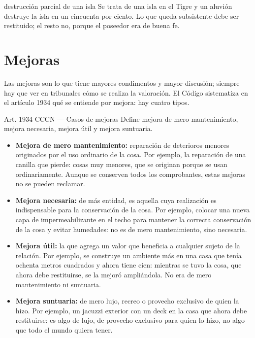 \documentclass[12pt,oneside]{book}
\begin{document}
\begin{example}{destrucción parcial de una isla}
Se trata de una isla en el Tigre y un aluvión destruye la isla en un cincuenta por ciento. Lo que queda subsistente debe ser restituido; el resto no, porque el poseedor era de buena fe.
\end{example}

\section{Mejoras}

Las mejoras son lo que tiene mayores condimentos y mayor discusión; siempre hay que ver en tribunales cómo se realiza la valoración. El Código sistematiza en el artículo 1934 qué se entiende por mejora: hay cuatro tipos.

\begin{articulo}{Art. 1934 CCCN --- Casos de mejoras}
Define mejora de mero mantenimiento, mejora necesaria, mejora útil y mejora suntuaria.
\end{articulo}

\begin{itemize}
    \item \textbf{Mejora de mero mantenimiento:} reparación de deterioros menores originados por el uso ordinario de la cosa. Por ejemplo, la reparación de una canilla que pierde: cosas muy menores, que se originan porque se usan ordinariamente. Aunque se conserven todos los comprobantes, estas mejoras no se pueden reclamar.
    \item \textbf{Mejora necesaria:} de más entidad, es aquella cuya realización es indispensable para la conservación de la cosa. Por ejemplo, colocar una nueva capa de impermeabilizante en el techo para mantener la correcta conservación de la cosa y evitar humedades: no es de mero mantenimiento, sino necesaria.
    \item \textbf{Mejora útil:} la que agrega un valor que beneficia a cualquier sujeto de la relación. Por ejemplo, se construye un ambiente más en una casa que tenía ochenta metros cuadrados y ahora tiene cien: mientras se tuvo la cosa, que ahora debe restituirse, se la mejoró ampliándola. No era de mero mantenimiento ni suntuaria.
    \item \textbf{Mejora suntuaria:} de mero lujo, recreo o provecho exclusivo de quien la hizo. Por ejemplo, un jacuzzi exterior con un deck en la casa que ahora debe restituirse: es algo de lujo, de provecho exclusivo para quien lo hizo, no algo que todo el mundo quiera tener.
\end{itemize}
\end{document}
